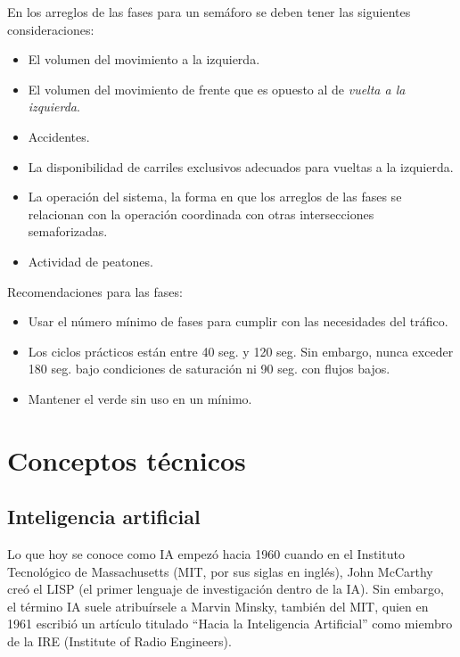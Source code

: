 En los arreglos de las fases para un semáforo se deben tener las siguientes consideraciones: \label{consideracionesfases}

{\setlength{\baselineskip}{0.7\baselineskip}\begin{itemize}
	\item El volumen del movimiento a la izquierda.
	\item El volumen del movimiento de frente que es opuesto al de \emph{vuelta a la izquierda}.
	\item Accidentes.
	\item La disponibilidad de carriles exclusivos adecuados para vueltas a la izquierda. 
	\item La operación del sistema, la forma en que los arreglos de las fases se relacionan con la operación coordinada con otras intersecciones semaforizadas. 
	\item Actividad de peatones.
\end{itemize}}

Recomendaciones para las fases: \label{recomendacionesfases}

{\setlength{\baselineskip}{0.7\baselineskip}\begin{itemize}
	\item Usar el número mínimo de fases para cumplir con las necesidades del tráfico. 
	\item Los ciclos prácticos están entre 40 seg. y 120 seg. Sin embargo, nunca exceder 180 seg. bajo condiciones de saturación ni 90 seg. con flujos bajos. 
	\item Mantener el verde sin uso en un mínimo.
\end{itemize}}

\section{Conceptos técnicos}

\subsection{Inteligencia artificial}
Lo que hoy se conoce como IA empezó hacia 1960 cuando en el Instituto Tecnológico de
Massachusetts (MIT, por sus siglas en inglés), John McCarthy creó el LISP (el primer lenguaje
de investigación dentro de la IA). Sin embargo, el término IA suele atribuírsele a Marvin Minsky,
también del MIT, quien en 1961 escribió un artículo titulado “Hacia la Inteligencia Artificial” como miembro de la IRE
(Institute of Radio Engineers).

